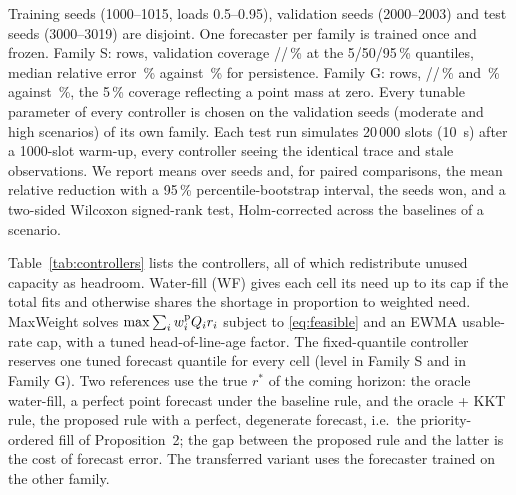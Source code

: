 \documentclass[conference]{IEEEtran}
\begin{document}
Training seeds (1000--1015, loads 0.5--0.95), validation seeds (2000--2003) and test seeds (3000--3019) are disjoint. One forecaster per family is trained once and frozen. Family S: \nTrainRows{} rows, validation coverage \covFive{}/\covFifty{}/\covNinetyFive{}\,\% at the 5/50/95\,\% quantiles, median relative error \maeGBM{}\,\% against \maePersist{}\,\% for persistence. Family G: \nTrainRowsTgpp{} rows, \covFiveTgpp{}/\covFiftyTgpp{}/\covNinetyFiveTgpp{}\,\% and \maeGBMTgpp{}\,\% against \maePersistTgpp{}\,\%, the 5\,\% coverage reflecting a point mass at zero. Every tunable parameter of every controller is chosen on the validation seeds (moderate and high scenarios) of its own family. Each test run simulates 20\,000 slots (10~s) after a 1000-slot warm-up, every controller seeing the identical trace and stale observations. We report means over \nSeeds{} seeds and, for paired comparisons, the mean relative reduction with a 95\,\% percentile-bootstrap interval, the seeds won, and a two-sided Wilcoxon signed-rank test, Holm-corrected across the baselines of a scenario.

Table~\ref{tab:controllers} lists the controllers, all of which redistribute unused capacity as headroom. Water-fill (WF) gives each cell its need up to its cap if the total fits and otherwise shares the shortage in proportion to weighted need. MaxWeight solves $\max \sum_i w_i^{\rm p} Q_i r_i$ subject to \eqref{eq:feasible} and an EWMA usable-rate cap, with a tuned head-of-line-age factor. The fixed-quantile controller reserves one tuned forecast quantile for every cell (level \fixedQuantileLevel{} in Family S and \fixedQuantileLevelTgpp{} in Family G). Two references use the true $r^\ast$ of the coming horizon: the oracle water-fill, a perfect point forecast under the baseline rule, and the oracle + KKT rule, the proposed rule with a perfect, degenerate forecast, i.e.\ the priority-ordered fill of Proposition~2; the gap between the proposed rule and the latter is the cost of forecast error. The transferred variant uses the forecaster trained on the other family.
\end{document}
